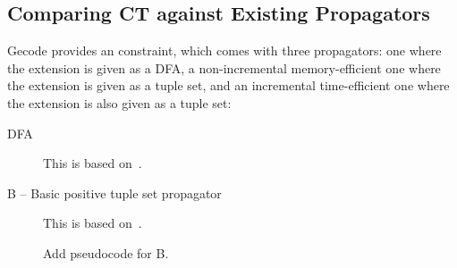 \documentclass[a4paper,11pt]{article}
\newcommand{\Todo}[1]{{\color{blue}#1}}
\newcommand{\Algoref}[1]{Algorithm~\ref{#1}}
\numberwithin{equation}{section}
\begin{document}
\subsection{Comparing CT against Existing Propagators}

Gecode provides an  constraint, which
comes with three propagators: one where the extension
is given as a DFA, a non-incremental memory-efficient one where
the extension is given as a tuple set, and an incremental
time-efficient one where the extension is also given as a tuple set:

\begin{description}
  \item[DFA] This is based on~\cite{Pesant:seqs}.
  \item[B -- Basic positive tuple set propagator]
    This is based on~\cite{DBLP:journals/ai/BessiereRYZ05}.

    \Todo{Add pseudocode for B}.





\end{description}
\end{document}

